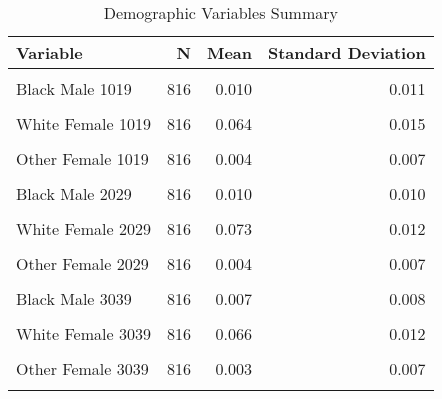 \begin{table}[H]

\caption{\label{tab:tab:replicatetable2b}Demographic Variables Summary}
\centering
\begin{tabular}[t]{lrrr}
\toprule
Variable & N & Mean & Standard Deviation\\
\midrule
\cellcolor{gray!6}{White Male 1019} & \cellcolor{gray!6}{816} & \cellcolor{gray!6}{0.067} & \cellcolor{gray!6}{0.015}\\
Black Male 1019 & 816 & 0.010 & 0.011\\
\cellcolor{gray!6}{Other Male 1019} & \cellcolor{gray!6}{816} & \cellcolor{gray!6}{0.004} & \cellcolor{gray!6}{0.008}\\
White Female 1019 & 816 & 0.064 & 0.015\\
\cellcolor{gray!6}{Black Female 1019} & \cellcolor{gray!6}{816} & \cellcolor{gray!6}{0.010} & \cellcolor{gray!6}{0.011}\\
\addlinespace
Other Female 1019 & 816 & 0.004 & 0.007\\
\cellcolor{gray!6}{White Male 2029} & \cellcolor{gray!6}{816} & \cellcolor{gray!6}{0.074} & \cellcolor{gray!6}{0.012}\\
Black Male 2029 & 816 & 0.010 & 0.010\\
\cellcolor{gray!6}{Other Male 2029} & \cellcolor{gray!6}{816} & \cellcolor{gray!6}{0.004} & \cellcolor{gray!6}{0.007}\\
White Female 2029 & 816 & 0.073 & 0.012\\
\addlinespace
\cellcolor{gray!6}{Black Female 2029} & \cellcolor{gray!6}{816} & \cellcolor{gray!6}{0.010} & \cellcolor{gray!6}{0.012}\\
Other Female 2029 & 816 & 0.004 & 0.007\\
\cellcolor{gray!6}{White Male 3039} & \cellcolor{gray!6}{816} & \cellcolor{gray!6}{0.066} & \cellcolor{gray!6}{0.012}\\
Black Male 3039 & 816 & 0.007 & 0.008\\
\cellcolor{gray!6}{Other Male 3039} & \cellcolor{gray!6}{816} & \cellcolor{gray!6}{0.003} & \cellcolor{gray!6}{0.007}\\
\addlinespace
White Female 3039 & 816 & 0.066 & 0.012\\
\cellcolor{gray!6}{Black Female 3039} & \cellcolor{gray!6}{816} & \cellcolor{gray!6}{0.008} & \cellcolor{gray!6}{0.010}\\
Other Female 3039 & 816 & 0.003 & 0.007\\
\cellcolor{gray!6}{White Male 4049} & \cellcolor{gray!6}{816} & \cellcolor{gray!6}{0.048} & \cellcolor{gray!6}{0.009}\\

\end{tabular}
\end{table}
